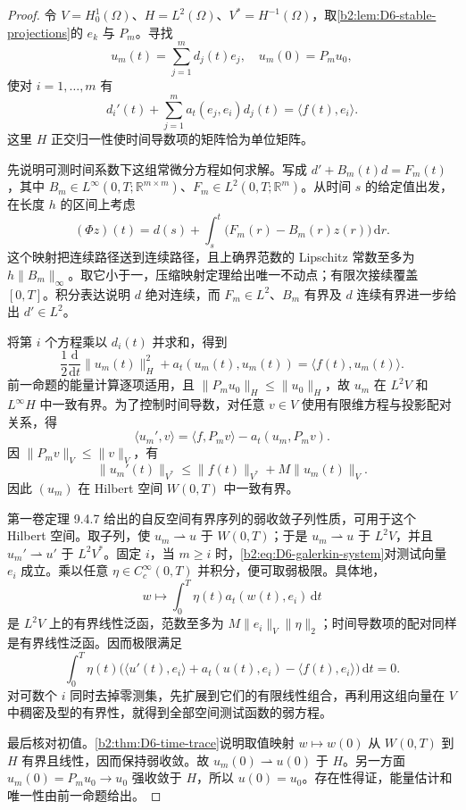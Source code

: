 \begin{proof}
令 \(V=H_0^1(\Omega)\)、\(H=L^2(\Omega)\)、\(V^*=H^{-1}(\Omega)\)，取\cref{b2:lem:D6-stable-projections}的 \(e_k\) 与 \(P_m\)。寻找
\[
 u_m(t)=\sum_{j=1}^m d_j(t)e_j,
 \quad u_m(0)=P_mu_0,
\]
使对 \(i=1,\ldots,m\) 有
\begin{equation}\label{b2:eq:D6-galerkin-system}
 d_i'(t)+\sum_{j=1}^m a_t(e_j,e_i)d_j(t)
       =\langle f(t),e_i\rangle.
\end{equation}
这里 \(H\) 正交归一性使时间导数项的矩阵恰为单位矩阵。

先说明可测时间系数下这组常微分方程如何求解。写成 \(d'+B_m(t)d=F_m(t)\)，其中 \(B_m\in L^\infty(0,T;\mathbb R^{m\times m})\)、\(F_m\in L^2(0,T;\mathbb R^m)\)。从时间 \(s\) 的给定值出发，在长度 \(h\) 的区间上考虑
\[
 (\Phi z)(t)=d(s)+\int_s^t\bigl(F_m(r)-B_m(r)z(r)\bigr)\,\mathrm dr.
\]
这个映射把连续路径送到连续路径，且上确界范数的 Lipschitz 常数至多为 \(h\|B_m\|_\infty\)。取它小于一，压缩映射定理给出唯一不动点；有限次接续覆盖 \([0,T]\)。积分表达说明 \(d\) 绝对连续，而 \(F_m\in L^2\)、\(B_m\) 有界及 \(d\) 连续有界进一步给出 \(d'\in L^2\)。

将第 \(i\) 个方程乘以 \(d_i(t)\) 并求和，得到
\[
 \frac12\frac{\mathrm d}{\mathrm dt}\|u_m(t)\|_H^2
       +a_t(u_m(t),u_m(t))=\langle f(t),u_m(t)\rangle.
\]
前一命题的能量计算逐项适用，且 \(\|P_mu_0\|_H\leq\|u_0\|_H\)，故 \(u_m\) 在 \(L^2V\) 和 \(L^\infty H\) 中一致有界。为了控制时间导数，对任意 \(v\in V\) 使用有限维方程与投影配对关系，得
\[
 \langle u_m',v\rangle
 =\langle f,P_mv\rangle-a_t(u_m,P_mv).
\]
因 \(\|P_mv\|_V\leq\|v\|_V\)，有
\[
 \|u_m'(t)\|_{V^*}\leq\|f(t)\|_{V^*}+M\|u_m(t)\|_V.
\]
因此 \((u_m)\) 在 Hilbert 空间 \(W(0,T)\) 中一致有界。

第一卷定理 9.4.7 给出的自反空间有界序列的弱收敛子列性质，可用于这个 Hilbert 空间。取子列，使 \(u_m\rightharpoonup u\) 于 \(W(0,T)\)；于是 \(u_m\rightharpoonup u\) 于 \(L^2V\)，并且 \(u_m'\rightharpoonup u'\) 于 \(L^2V^*\)。固定 \(i\)，当 \(m\geq i\) 时，\eqref{b2:eq:D6-galerkin-system}对测试向量 \(e_i\) 成立。乘以任意 \(\eta\in C_c^\infty(0,T)\) 并积分，便可取弱极限。具体地，
\[
 w\longmapsto\int_0^T\eta(t)a_t(w(t),e_i)\,\mathrm dt
\]
是 \(L^2V\) 上的有界线性泛函，范数至多为 \(M\|e_i\|_V\|\eta\|_2\)；时间导数项的配对同样是有界线性泛函。因而极限满足
\[
 \int_0^T\eta(t)\bigl(\langle u'(t),e_i\rangle
       +a_t(u(t),e_i)-\langle f(t),e_i\rangle\bigr)\,\mathrm dt=0.
\]
对可数个 \(i\) 同时去掉零测集，先扩展到它们的有限线性组合，再利用这组向量在 \(V\) 中稠密及型的有界性，就得到全部空间测试函数的弱方程。

最后核对初值。\cref{b2:thm:D6-time-trace}说明取值映射 \(w\mapsto w(0)\) 从 \(W(0,T)\) 到 \(H\) 有界且线性，因而保持弱收敛。故 \(u_m(0)\rightharpoonup u(0)\) 于 \(H\)。另一方面 \(u_m(0)=P_mu_0\to u_0\) 强收敛于 \(H\)，所以 \(u(0)=u_0\)。存在性得证，能量估计和唯一性由前一命题给出。
\end{proof}

